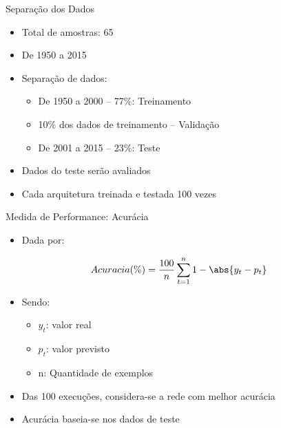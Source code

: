 \begin{frame}{Separação dos Dados}
	\begin{itemize}
		\item Total de amostras: 65
		\item De 1950 a 2015
		\item Separação de dados:
		\begin{itemize}
			\item De 1950 a 2000 -- 77$\%$: Treinamento
			\item 10$\%$ dos dados de treinamento -- Validação
			\item De 2001 a 2015 -- 23$\%$: Teste
		\end{itemize}
		\item Dados do teste serão avaliados
		\item Cada arquitetura treinada e testada 100 vezes
	\end{itemize}
\end{frame}


\begin{frame}{Medida de Performance: Acurácia}
	\begin{itemize}
		\item Dada por:
	\end{itemize}
	\begin{equation}
		Acuracia(\%) = \frac{100}{n}\sum_{t=1}^n 1 - \abs{y_t - p_t}
	\end{equation}
	\begin{itemize}
		\item Sendo:
		\begin{itemize}
			\item $y_t$: valor real
			\item $p_t$: valor previsto
			\item n: Quantidade de exemplos
		\end{itemize}
		\item Das 100 execuções, considera-se a rede com melhor acurácia
		\item Acurácia baseia-se nos dados de teste
	\end{itemize}
\end{frame}

